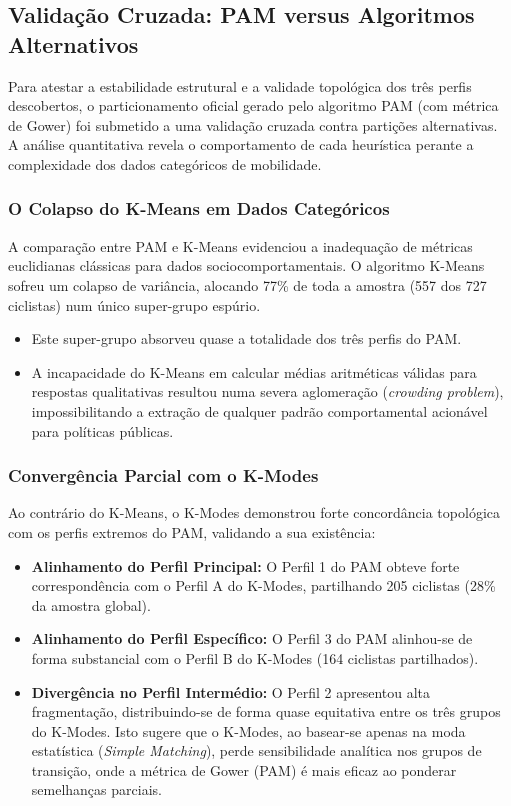 \documentclass[12pt]{article}
\begin{document}
\newpage
\subsection{Validação Cruzada: PAM versus Algoritmos Alternativos}

Para atestar a estabilidade estrutural e a validade topológica dos três perfis descobertos, o particionamento oficial gerado pelo algoritmo PAM (com métrica de Gower) foi submetido a uma validação cruzada contra partições alternativas. A análise quantitativa revela o comportamento de cada heurística perante a complexidade dos dados categóricos de mobilidade.

\subsubsection{O Colapso do K-Means em Dados Categóricos}
A comparação entre PAM e K-Means evidenciou a inadequação de métricas euclidianas clássicas para dados sociocomportamentais. O algoritmo K-Means sofreu um colapso de variância, alocando 77\% de toda a amostra (557 dos 727 ciclistas) num único super-grupo espúrio. 
\begin{itemize}
    \item Este super-grupo absorveu quase a totalidade dos três perfis do PAM.
    \item A incapacidade do K-Means em calcular médias aritméticas válidas para respostas qualitativas resultou numa severa aglomeração (\textit{crowding problem}), impossibilitando a extração de qualquer padrão comportamental acionável para políticas públicas.
\end{itemize}

\subsubsection{Convergência Parcial com o K-Modes}
Ao contrário do K-Means, o K-Modes demonstrou forte concordância topológica com os perfis extremos do PAM, validando a sua existência:
\begin{itemize}
    \item \textbf{Alinhamento do Perfil Principal:} O Perfil 1 do PAM obteve forte correspondência com o Perfil A do K-Modes, partilhando 205 ciclistas (28\% da amostra global).
    \item \textbf{Alinhamento do Perfil Específico:} O Perfil 3 do PAM alinhou-se de forma substancial com o Perfil B do K-Modes (164 ciclistas partilhados).
    \item \textbf{Divergência no Perfil Intermédio:} O Perfil 2 apresentou alta fragmentação, distribuindo-se de forma quase equitativa entre os três grupos do K-Modes. Isto sugere que o K-Modes, ao basear-se apenas na moda estatística (\textit{Simple Matching}), perde sensibilidade analítica nos grupos de transição, onde a métrica de Gower (PAM) é mais eficaz ao ponderar semelhanças parciais.
\end{itemize}
\end{document}
